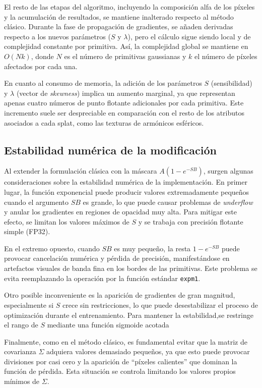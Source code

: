El resto de las etapas del algoritmo, incluyendo la composición alfa de los píxeles y la acumulación de resultados, se mantiene inalterado respecto al método clásico. Durante la fase de propagación de gradientes, se añaden derivadas respecto a los nuevos parámetros ($S$ y $\lambda$), pero el cálculo sigue siendo local y de complejidad constante por primitiva. Así, la complejidad global se mantiene en $O(Nk)$, donde $N$ es el número de primitivas gaussianas y $k$ el número de píxeles afectados por cada una.

En cuanto al consumo de memoria, la adición de los parámetros $S$ (sensibilidad) y $\lambda$ (vector de \textit{skewness}) implica un aumento marginal, ya que representan apenas cuatro números de punto flotante adicionales por cada primitiva. Este incremento suele ser despreciable en comparación con el resto de los atributos asociados a cada splat, como las texturas de armónicos esféricos.


\subsection{Estabilidad numérica de la modificación}

Al extender la formulación clásica con la máscara $A(1-e^{-SB})$, surgen algunas consideraciones sobre la estabilidad numérica de la implementación. En primer lugar, la función exponencial puede producir valores extremadamente pequeños cuando el argumento $SB$ es grande, lo que puede causar problemas de \textit{underflow} y anular los gradientes en regiones de opacidad muy alta. Para mitigar este efecto, se limitan los valores máximos de $S$ y se trabaja con precisión flotante simple (FP32).

En el extremo opuesto, cuando $SB$ es muy pequeño, la resta $1-e^{-SB}$ puede provocar cancelación numérica y pérdida de precisión, manifestándose en artefactos visuales de banda fina en los bordes de las primitivas. Este problema se evita reemplazando la operación por la función estándar \texttt{expm1}.

Otro posible inconveniente es la aparición de gradientes de gran magnitud, especialmente si $S$ crece sin restricciones, lo que puede desestabilizar el proceso de optimización durante el entrenamiento. Para mantener la estabilidad,se restringe el rango de $S$ mediante una función sigmoide acotada

Finalmente, como en el método clásico, es fundamental evitar que la matriz de covarianza $\Sigma$ adquiera valores demasiado pequeños, ya que esto puede provocar divisiones por casi cero y la aparición de “píxeles calientes” que dominan la función de pérdida. Esta situación se controla limitando los valores propios mínimos de $\Sigma$.

